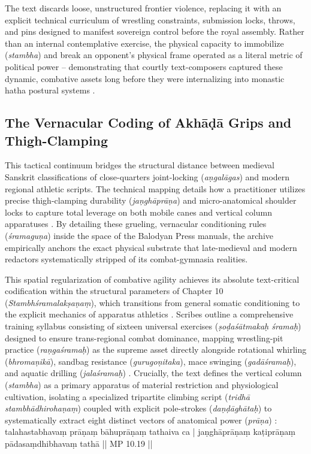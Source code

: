 \documentclass[11pt,twoside,letterpaper]{article}
\begin{document}
The text discards loose, unstructured frontier violence, replacing it with an explicit technical curriculum of wrestling constraints, submission locks, throws, and pins designed to manifest sovereign control before the royal assembly. Rather than an internal contemplative exercise, the physical capacity to immobilize (\textit{stambha}) and break an opponent’s physical frame operated as a literal metric of political power – demonstrating that courtly text-composers captured these dynamic, combative assets long before they were internalizing into monastic hatha postural systems \citep{OHanlon2007}.

\subsection{The Vernacular Coding of Akh\={a}\d{d}\={a} Grips and Thigh-Clamping}
This tactical continuum bridges the structural distance between medieval Sanskrit classifications of close-quarters joint-locking (\textit{a\d{n}gal\={a}gas}) and modern regional athletic scripts. The technical mapping details how a practitioner utilizes precise thigh-clamping durability (\textit{ja\d{n}gh\={a}pr\={a}\d{n}a}) and micro-anatomical shoulder locks to capture total leverage on both mobile canes and vertical column apparatuses \citep{Khasgivale1929}. By detailing these grueling, vernacular conditioning rules (\textit{\'sramagu\d{n}a}) inside the space of the Balodyan Press manuals, the archive empirically anchors the exact physical substrate that late-medieval and modern redactors systematically stripped of its combat-gymnasia realities.

This spatial regularization of combative agility achieves its absolute text-critical codification within the structural parameters of Chapter 10 (\textit{Stambh\'sramalak\d{s}a\d{n}a\d{m}}), which transitions from general somatic conditioning to the explicit mechanics of apparatus athletics \citep{MP_7_v7}. Scribes outline a comprehensive training syllabus consisting of sixteen universal exercises (\textit{\d{s}o\d{d}a\'s\={a}tmaka\d{h} \'srama\d{h}}) designed to ensure trans-regional combat dominance, mapping wrestling-pit practice (\textit{ra\d{n}ga\'srama\d{h}}) as the supreme asset directly alongside rotational whirling (\textit{bhroma\d{n}ik\={a}}), sandbag resistance (\textit{gurugo\d{n}itaka}), mace swinging (\textit{gad\={a}\'srama\d{h}}), and aquatic drilling (\textit{jala\'srama\d{h}}) \citep{MP_7_v8}. Crucially, the text defines the vertical column (\textit{stambha}) as a primary apparatus of material restriction and physiological cultivation, isolating a specialized tripartite climbing script (\textit{tridh\={a} stambh\={a}dhiroha\d{n}a\d{m}}) coupled with explicit pole-strokes (\textit{da\d{n}\d{d}\={a}gh\={a}ta\d{h}}) to systematically extract eight distinct vectors of anatomical power (\textit{pr\={a}\d{n}a}) \citep{MP_7_v9}:
talahastabhava\d{m} pr\={a}\d{n}a\d{m} b\={a}hupr\={a}\d{n}a\d{m} tathaiva ca |
ja\d{n}gh\={a}pr\={a}\d{n}a\d{m} ka\d{t}ipr\={a}\d{n}a\d{m} p\={a}dasa\d{m}dhibhava\d{m} tath\={a} || MP 10.19 ||
\end{document}
